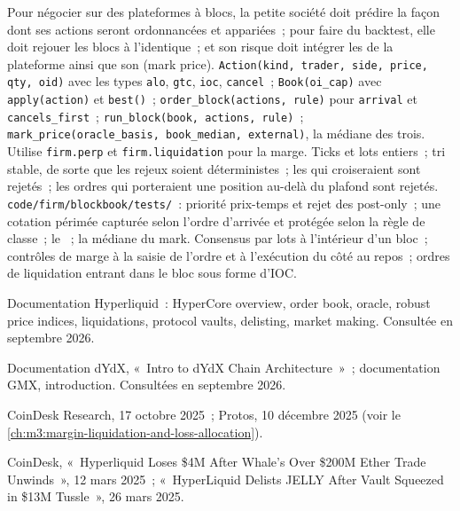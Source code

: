 \begin{build}
 Pour négocier sur des plateformes à blocs, la petite société doit prédire la façon dont ses actions seront ordonnancées et appariées~; pour faire du backtest, elle doit rejouer
les blocs à l'identique~; et son risque doit intégrer les  de la plateforme ainsi que son  (mark price).
 \texttt{Action(kind, trader, side, price, qty, oid)} avec les types \texttt{alo}, \texttt{gtc}, \texttt{ioc}, \texttt{cancel}~;
\texttt{Book(oi\_cap)} avec \texttt{apply(action)} et \texttt{best()}~; \texttt{order\_block(actions, rule)} pour \texttt{arrival} et
\texttt{cancels\_first}~; \texttt{run\_block(book, actions, rule)}~; \texttt{mark\_price(oracle\_basis, book\_median, external)}, la médiane des trois. Utilise \texttt{firm.perp} et
\texttt{firm.liquidation} pour la marge.
 Ticks et lots entiers~; tri stable, de sorte que les rejeux soient déterministes~; les  qui croiseraient sont rejetés~; les ordres qui porteraient une
position au-delà du plafond sont rejetés.
 \texttt{code/firm/blockbook/tests/}~: priorité prix-temps et rejet des post-only~; une cotation périmée capturée selon l'ordre d'arrivée et protégée
selon la règle de classe~; le ~; la médiane du mark.
 Consensus par lots à l'intérieur d'un bloc~; contrôles de marge à la saisie de l'ordre et à l'exécution du côté au repos~; ordres de liquidation entrant dans le bloc sous forme d'IOC.
\end{build}

\begin{omsources}
\item Documentation Hyperliquid~: HyperCore overview, order book, oracle, robust price indices, liquidations, protocol vaults, delisting, market making.
Consultée en septembre 2026.
\item Documentation dYdX, «~Intro to dYdX Chain Architecture~»~; documentation GMX, introduction. Consultées en septembre 2026.
\item CoinDesk Research, 17 octobre 2025~; Protos, 10 décembre 2025 (voir le \cref{ch:m3:margin-liquidation-and-loss-allocation}).
\item CoinDesk, «~Hyperliquid Loses \$4M After Whale's Over \$200M Ether Trade Unwinds~», 12 mars 2025~; «~HyperLiquid Delists JELLY
After Vault Squeezed in \$13M Tussle~», 26 mars 2025.
\end{omsources}

